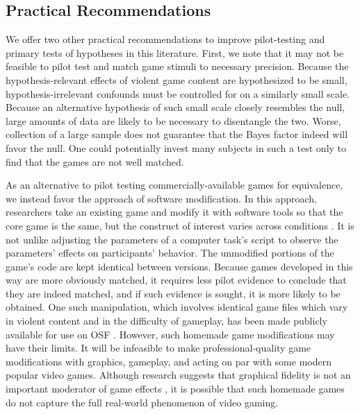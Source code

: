 \documentclass[man]{apa6}
\begin{document}
\subsection{Practical Recommendations}
We offer two other practical recommendations to improve pilot-testing and primary tests of hypotheses in this literature. First, we note that it may not be feasible to pilot test and match game stimuli to necessary precision. Because the hypothesis-relevant effects of violent game content are hypothesized to be small, hypothesis-irrelevant confounds must be controlled for on a similarly small scale. Because an alternative hypothesis of such small scale closely resembles the null, large amounts of data are likely to be necessary to disentangle the two. Worse, collection of a large sample does not guarantee that the Bayes factor indeed will favor the null. One could potentially invest many subjects in such a test only to find that the games are not well matched. 

As an alternative to pilot testing commercially-available games for equivalence, we instead favor the approach of software modification. In this approach, researchers take an existing game and modify it with software tools so that the core game is the same, but the construct of interest varies across conditions \citep[see][]{Elson:Quandt:2014}. It is not unlike adjusting the parameters of a computer task's script to observe the parameters' effects on participants' behavior. The unmodified portions of the game's code are kept identical between versions. Because games developed in this way are more obviously matched, it requires less pilot evidence to conclude that they are indeed matched, and if such evidence is sought, it is more likely to be obtained. One such manipulation, which involves identical game files which vary in violent content and in the difficulty of gameplay, has been made publicly available for use on OSF \citep{Hilgard:2014}. However, such homemade game modifications may have their limits. It will be infeasible to make professional-quality game modifications with graphics, gameplay, and acting on par with some modern popular video games. Although research suggests that graphical fidelity is not an important moderator of game effects \citep{Barlett:etal:2008,Ivory:Kalyanaraman:2007}, it is possible that such homemade games do not capture the full real-world phenomenon of video gaming.
\end{document}
